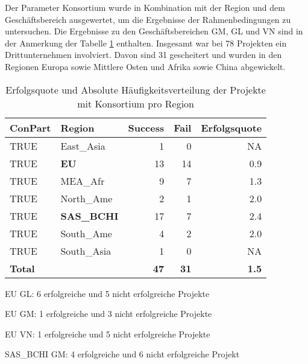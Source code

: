 %
Der Parameter Konsortium wurde in Kombination mit der Region und dem Geschäftsbereich ausgewertet, um die Ergebnisse der Rahmenbedingungen zu untersuchen. Die Ergebnisse zu den Geschäftsbereichen GM, GL und VN sind in der Anmerkung der Tabelle \ref{tab:fcons} enthalten. Insgesamt war bei 78 Projekten ein Drittunternehmen involviert. Davon sind 31 gescheitert und wurden in den Regionen Europa sowie Mittlere Osten und Afrika sowie China abgewickelt. 
\begin{table}[H]
	\centering
	\begin{threeparttable}	
	\caption{Erfolgsquote und Absolute Häufigkeitsverteilung der Projekte mit Konsortium pro Region}
	\begin{tabular}{lrrrr}
		\toprule
		\textbf{ConPart} & \multicolumn{1}{l}{\textbf{Region}} & \multicolumn{1}{l}{\textbf{Success}} & \multicolumn{1}{l}{\textbf{Fail}} & \multicolumn{1}{l}{\textbf{Erfolgsquote}} \\
		\midrule
		TRUE  & \multicolumn{1}{l}{East\_Asia} & 1     & 0     & NA \\
		TRUE  & \multicolumn{1}{l}{\textbf{EU}} & 13    & 14    & 0.9 \\
		TRUE  & \multicolumn{1}{l}{MEA\_Afr} & 9     & 7     & 1.3 \\
		TRUE  & \multicolumn{1}{l}{North\_Ame} & 2     & 1     & 2.0 \\
		TRUE  & \multicolumn{1}{l}{\textbf{SAS\_BCHI}} & 17    & 7     & 2.4 \\
		TRUE  & \multicolumn{1}{l}{South\_Ame} & 4     & 2     & 2.0 \\
		TRUE  & \multicolumn{1}{l}{South\_Asia} & 1     & 0     & NA \\\hline
		\textbf{Total} &       & \textbf{47} & \textbf{31} & \textbf{1.5} \\
	\end{tabular}%
	\begin{tablenotes}
	\tiny
	\item EU GL: 6 erfolgreiche und 5 nicht erfolgreiche Projekte
	\item EU GM: 1 erfolgreiche und 3 nicht erfolgreiche Projekte
	\item EU VN: 1 erfolgreiche und 5 nicht erfolgreiche Projekte
	\item SAS\_BCHI GM: 4 erfolgreiche und 6 nicht erfolgreiche Projekt
	\end{tablenotes}
	\label{tab:fcons}%
	\end{threeparttable}
\end{table}%
\clearpage
